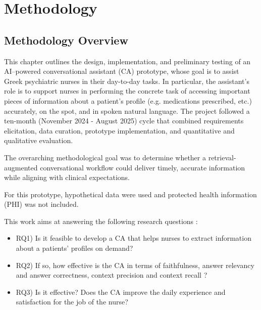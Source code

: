 
\chapter{Methodology}\label{chap:methodology}

\ifpdf
    \graphicspath{{Chapter3/Figs/Raster/}{Chapter3/Figs/PDF/}{Chapter3/Figs/}}
\else
    \graphicspath{{Chapter3/Figs/Vector/}{Chapter3/Figs/}}
\fi

\section{Methodology Overview}
This chapter outlines the design, implementation, and preliminary testing of an AI–powered conversational assistant (CA) prototype, whose goal is to assist Greek psychiatric nurses in their day-to-day tasks. In particular, the assistant's role is to support nurses in performing the concrete task of accessing important pieces of information about a patient's profile (e.g. medications prescribed, etc.) accurately, on the spot, and in spoken natural language. The project followed a ten-month (November 2024 - August 2025) cycle that combined requirements elicitation, data curation, prototype implementation, and quantitative and qualitative evaluation. 

The overarching methodological goal was to determine whether a retrieval-augmented conversational workflow could deliver timely, accurate information while aligning with clinical expectations.

For this prototype, hypothetical data were used and protected health information (PHI) was not included.

This work aims at answering the following research questions \label{RQs}:
\begin{itemize}
    \item RQ1) Is it feasible to develop a CA that helps nurses to extract information about a patients' profiles on demand?
    \item RQ2) If so, how effective is the CA in terms of faithfulness, answer relevancy and answer correctness, context precision and context recall ?
    \item RQ3) Is it effective? Does the CA improve the daily experience and satisfaction for the job of the nurse?
\end{itemize}



